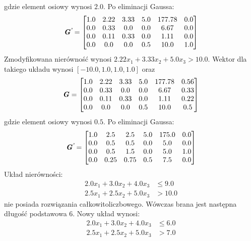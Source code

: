 gdzie element osiowy wynosi $2.0$. Po eliminacji Gaussa:
\begin{equation*}
  \textbf{\textit{G\textsuperscript{'}}} =
  \begin{bmatrix}
    1.0 & 2.22 & 3.33 & 5.0 & 177.78 & 0.0 \\
    0.0 & 0.33 & 0.0 & 0.0 & 6.67 & 0.0 \\
    0.0 & 0.11 & 0.33 & 0.0 & 1.11 & 0.0 \\
    0.0 & 0.0 & 0.0 & 0.5 & 10.0 & 1.0
  \end{bmatrix}
\end{equation*}
Zmodyfikowana nierówność wynosi $ 2.22 x_{1}+ 3.33 x_{2}+ 5.0 x_{3} > 10.0$. Wektor  dla takiego układu wynosi $[-10.0,1.0,1.0,1.0]$ oraz
\begin{equation*}
  \textbf{\textit{G}} =
  \begin{bmatrix}
    1.0 & 2.22 & 3.33 & 5.0 & 177.78 & 0.56 \\
    0.0 & 0.33 & 0.0 & 0.0 & 6.67 & 0.33 \\
    0.0 & 0.11 & 0.33 & 0.0 & 1.11 & 0.22 \\
    0.0 & 0.0 & 0.0 & 0.5 & 10.0 & 0.5
  \end{bmatrix}
\end{equation*}
gdzie element osiowy wynosi $0.5$. Po eliminacji Gaussa:
\begin{equation*}
  \textbf{\textit{G\textsuperscript{'}}} =
  \begin{bmatrix}
    1.0 & 2.5 & 2.5 & 5.0 & 175.0 & 0.0 \\
    0.0 & 0.5 & 0.5 & 0.0 & 5.0 & 0.0 \\
    0.0 & 0.5 & 1.5 & 0.0 & 5.0 & 1.0 \\
    0.0 & 0.25 & 0.75 & 0.5 & 7.5 & 0.0
  \end{bmatrix}
\end{equation*}
Układ nierówności:
\begin{equation*}
  \begin{aligned}
    2.0 x_{1}+ 3.0 x_{2}+ 4.0 x_{3} &\le 9.0 \\
    2.5 x_{1}+ 2.5 x_{2}+ 5.0 x_{3} &> 10.0
  \end{aligned}
\end{equation*}
nie posiada rozwiązania całkowitoliczbowego. Wówczas brana jest następna długość podstawowa 6. Nowy układ wynosi:
\begin{equation*}
  \begin{aligned}
    2.0 x_{1}+ 3.0 x_{2}+ 4.0 x_{3} &\le 6.0 \\
    2.5 x_{1}+ 2.5 x_{2}+ 5.0 x_{3} &> 7.0
  \end{aligned}
\end{equation*}
